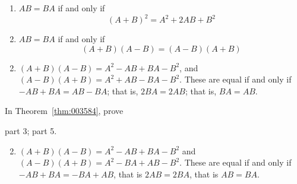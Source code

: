 \begin{multicols}{2}
\begin{ex}
\begin{enumerate}[label={\alph*.}]
\item $AB = BA$ if and only if
\begin{equation*}
(A + B)^{2} = A^{2} + 2AB + B^{2}
\end{equation*}
\item $AB = BA$ if and only if
\begin{equation*}
(A + B)(A - B) = (A - B)(A + B)
\end{equation*}
\end{enumerate}
\begin{sol}
\begin{enumerate}[label={\alph*.}]
\setcounter{enumi}{1}
\item $(A + B)(A - B) = A^{2} - AB + BA - B^{2}$, and $(A - B)(A + B) = A^{2} + AB - BA - B^{2}$. These are equal if and only if $-AB + BA = AB - BA$; that is, $2BA = 2AB$; that is, $BA = AB$.

\end{enumerate}
\end{sol}
\end{ex}

\begin{ex}
In Theorem~\ref{thm:003584}, prove
\begin{exenumerate}
\exitem part 3;
\exitem part 5.
\end{exenumerate}
\begin{sol}
\begin{enumerate}[label={\alph*.}]
\setcounter{enumi}{1}
\item  $(A + B)(A - B) = A^{2} - AB + BA - B^{2}$ and $(A - B)(A + B) = A^{2} - BA + AB - B^{2}$. These are equal if and only if $-AB + BA = -BA + AB$, that is $2AB = 2BA$, that is $AB = BA$.

\end{enumerate}
\end{sol}
\end{ex}




\end{multicols}
